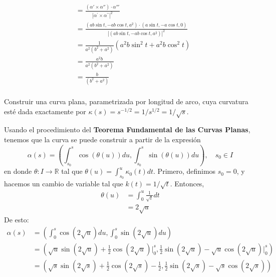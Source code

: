 \begin{problema}
\begin{sol}
\begin{itemize}
\begin{align*}
            &=\frac{(\alpha' \times  \alpha'')\cdot \alpha'''}{\left|\alpha^{\prime} \times \alpha^{\prime \prime}\right|^{2}}\\
            &= \frac{\left(ab\sin t, -ab\cos t, a^2\right)\cdot(a \sin t, -a \cos t, 0) }{|\left(ab\sin t, -ab\cos t, a^2\right)|^2}\\
            &= \frac{1}{a^2(b^2+a^2)}(a^2b\sin^2t +a^2b\cos^2t )\\
            &= \frac{a^2b}{a^2(b^2+a^2)}\\
            &= \frac{b}{(b^2+a^2)}\\
        \end{align*}
    \end{itemize}
\end{sol}
\end{problema}

\begin{problema}
     Construir una curva plana, parametrizada por longitud de arco, cuya curvatura esté dada exactamente por $\kappa(s)=s^{-1 / 2}=1/s^{1/2}=1/\sqrt{s}$.
    \begin{sol}
        Usando el procedimiento del \textbf{Teorema Fundamental de las Curvas Planas}, tenemos que la curva se puede construir a partir de la expresión 
        $$\alpha(s)=\left(\int_{s_0}^{s}\cos(\theta(u))du,\int_{s_0}^{s}\sin(\theta(u))du\right), \quad s_0\in I$$
        en donde $\theta: I\to\mathbb{R}$ tal que $\theta(u)=\int_{s_0}^{u}\kappa_0(t)dt$. Primero, definimos $s_0=0$, y hacemos un cambio de variable tal que $k(t)=1/\sqrt{t}$. Entonces, 
        \begin{align*}
            \theta(u)&=\int_{0}^{u}\frac{1}{\sqrt{t}}dt\\
            &= 2\sqrt{u}
        \end{align*}
        De esto: 
        \begin{align*}
            \alpha(s)&=\left(\int_{0}^{s}\cos(2\sqrt{u})du,\int_{0}^{s}\sin(2\sqrt{u})du\right)\\
            &= \left(\sqrt{u}\sin(2\sqrt{u})+\frac{1}{2}\cos (2\sqrt{u})\Big|_0^s,\frac{1}{2}\sin(2\sqrt{u})-\sqrt{u}\cos(2\sqrt{u})\Big|_0^s\right)\\
            &= \left(\sqrt{s}\sin(2\sqrt{s})+\frac{1}{2}\cos (2\sqrt{s})-\frac{1}{2},\frac{1}{2}\sin(2\sqrt{s})-\sqrt{s}\cos(2\sqrt{s})\right)\\
        \end{align*}


       
    \end{sol}
\end{problema}

%
%

